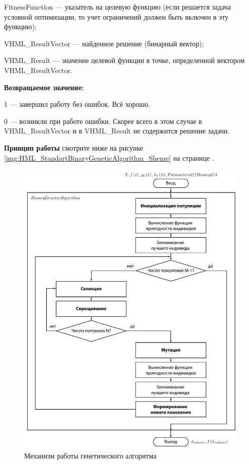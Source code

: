 FitnessFunction --- указатель на целевую функцию (если решается задача условной оптимизации, то учет ограничений должен быть включен в эту функцию);
 
VHML\_ResultVector --- найденное решение (бинарный вектор);
 
VHML\_Result --- значение целевой функции в точке, определенной вектором VHML\_ResultVector.

\textbf{Возвращаемое значение:} 

 1 --- завершил работу без ошибок. Всё хорошо.
 
 0 --- возникли при работе ошибки. Скорее всего в этом случае в VHML\_ResultVector и в VHML\_Result не содержится решение задачи.

 \textbf{Принцип работы} смотрите ниже на рисунке \ref{img:HML_StandartBinaryGeneticAlgorithm_Sheme} на странице \pageref{img:HML_StandartBinaryGeneticAlgorithm_Sheme}.

\begin{figure} [h]
  \center
  \includegraphics [scale=0.5] {HML_StandartBinaryGeneticAlgorithm_Sheme}
  \caption{Механизм работы генетического алгоритма} 
\end{figure}

